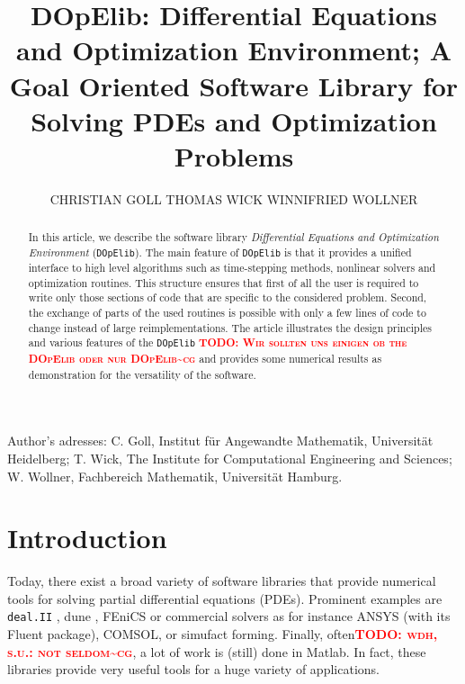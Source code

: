 \documentclass[prodmode,acmtoms]{acmsmall}
\numberwithin{equation}{section}
\newcommand{\deal}{\texttt{deal.II}}
\newcommand{\dope}{\texttt{DOpElib}}
\newcommand{\todocg}[1]{\textbf{\textsc{\textcolor{red}{TODO: #1\textasciitilde cg}}}}
\begin{document}

\title{DOpElib: Differential Equations and Optimization Environment; A Goal Oriented Software Library for Solving PDEs and Optimization Problems}

\author{CHRISTIAN GOLL
THOMAS WICK
WINNIFRIED WOLLNER
}


\begin{abstract}
In this article, we describe the software library 
\textit{Differential Equations and Optimization Environment} (\dope{}).
The main feature of \dope{} is that it provides a unified interface to high level algorithms 
such as time-stepping methods, nonlinear solvers and optimization routines. This structure ensures 
that first of all the user is required to write only those sections of code that are specific to 
the considered problem. Second, the exchange of parts of the used routines is possible 
with only a few lines of code to change instead of large reimplementations.
The article illustrates the design principles and various features
of the \dope{} \todocg{Wir sollten uns einigen ob the DOpElib oder nur DOpElib} and provides some 
numerical results as demonstration for the versatility of the software.
\end{abstract}

\begin{bottomstuff}
Author's adresses: C. Goll, Institut f\"ur Angewandte Mathematik,
Universit\"at Heidelberg;
T. Wick, The Institute for Computational Engineering and Sciences;
W. Wollner, Fachbereich Mathematik, Universit\"at Hamburg.
\end{bottomstuff}
                      

\maketitle


\section{Introduction}
\label{introduction}
Today, there exist a broad variety of software libraries
that provide numerical tools for solving partial differential
equations (PDEs). Prominent examples are 
\deal{} \cite{dealnew}, dune \cite{dune}, 
FEniCS \cite{fenics}
or commercial solvers as for instance ANSYS (with its Fluent package),
COMSOL, or simufact forming.
Finally, often\todocg{wdh, s.u.: not seldom}, a lot of work is (still) done in Matlab.
In fact, these libraries provide very useful tools 
for a huge variety of applications. 
\end{document}
